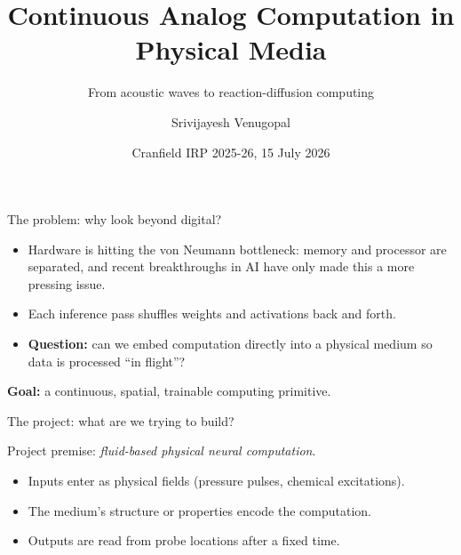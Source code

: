 \documentclass[aspectratio=169,11pt]{beamer}
\title{Continuous Analog Computation in Physical Media}
\subtitle{From acoustic waves to reaction-diffusion computing}
\author{Srivijayesh Venugopal}
\date{Cranfield IRP 2025-26, 15 July 2026}
\begin{document}
\begin{frame}
\titlepage
\end{frame}

\begin{frame}{The problem: why look beyond digital?}

\begin{itemize}
    \item Hardware is hitting the von Neumann bottleneck: memory and processor are separated, and recent breakthroughs in AI have only made this a more pressing issue.
    \item Each inference pass shuffles weights and activations back and forth.
    \item \textbf{Question:} can we embed computation directly into a physical medium so data is processed ``in flight''?
\end{itemize}

\vspace{0.5cm}
\centering
\textbf{Goal:} a continuous, spatial, trainable computing primitive.

\end{frame}

\begin{frame}{The project: what are we trying to build?}

Project premise: \textit{fluid-based physical neural computation}.

\vspace{0.3cm}
\begin{itemize}
    \item Inputs enter as physical fields (pressure pulses, chemical excitations).
    \item The medium's structure or properties encode the computation.
    \item Outputs are read from probe locations after a fixed time.
\end{itemize}

\vspace{0.3cm}
\centering
{}

\end{frame}
\end{document}
